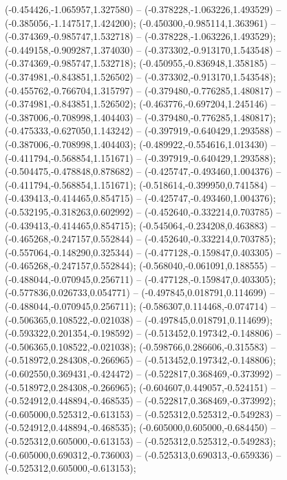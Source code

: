  (-0.454426,-1.065957,1.327580) -- (-0.378228,-1.063226,1.493529) -- (-0.385056,-1.147517,1.424200);
 (-0.450300,-0.985114,1.363961) -- (-0.374369,-0.985747,1.532718) -- (-0.378228,-1.063226,1.493529);
 (-0.449158,-0.909287,1.374030) -- (-0.373302,-0.913170,1.543548) -- (-0.374369,-0.985747,1.532718);
 (-0.450955,-0.836948,1.358185) -- (-0.374981,-0.843851,1.526502) -- (-0.373302,-0.913170,1.543548);
 (-0.455762,-0.766704,1.315797) -- (-0.379480,-0.776285,1.480817) -- (-0.374981,-0.843851,1.526502);
 (-0.463776,-0.697204,1.245146) -- (-0.387006,-0.708998,1.404403) -- (-0.379480,-0.776285,1.480817);
 (-0.475333,-0.627050,1.143242) -- (-0.397919,-0.640429,1.293588) -- (-0.387006,-0.708998,1.404403);
 (-0.489922,-0.554616,1.013430) -- (-0.411794,-0.568854,1.151671) -- (-0.397919,-0.640429,1.293588);
 (-0.504475,-0.478848,0.878682) -- (-0.425747,-0.493460,1.004376) -- (-0.411794,-0.568854,1.151671);
 (-0.518614,-0.399950,0.741584) -- (-0.439413,-0.414465,0.854715) -- (-0.425747,-0.493460,1.004376);
 (-0.532195,-0.318263,0.602992) -- (-0.452640,-0.332214,0.703785) -- (-0.439413,-0.414465,0.854715);
 (-0.545064,-0.234208,0.463883) -- (-0.465268,-0.247157,0.552844) -- (-0.452640,-0.332214,0.703785);
 (-0.557064,-0.148290,0.325344) -- (-0.477128,-0.159847,0.403305) -- (-0.465268,-0.247157,0.552844);
 (-0.568040,-0.061091,0.188555) -- (-0.488044,-0.070945,0.256711) -- (-0.477128,-0.159847,0.403305);
 (-0.577836,0.026733,0.054771) -- (-0.497845,0.018791,0.114699) -- (-0.488044,-0.070945,0.256711);
 (-0.586307,0.114468,-0.074714) -- (-0.506365,0.108522,-0.021038) -- (-0.497845,0.018791,0.114699);
 (-0.593322,0.201354,-0.198592) -- (-0.513452,0.197342,-0.148806) -- (-0.506365,0.108522,-0.021038);
 (-0.598766,0.286606,-0.315583) -- (-0.518972,0.284308,-0.266965) -- (-0.513452,0.197342,-0.148806);
 (-0.602550,0.369431,-0.424472) -- (-0.522817,0.368469,-0.373992) -- (-0.518972,0.284308,-0.266965);
 (-0.604607,0.449057,-0.524151) -- (-0.524912,0.448894,-0.468535) -- (-0.522817,0.368469,-0.373992);
 (-0.605000,0.525312,-0.613153) -- (-0.525312,0.525312,-0.549283) -- (-0.524912,0.448894,-0.468535);
 (-0.605000,0.605000,-0.684450) -- (-0.525312,0.605000,-0.613153) -- (-0.525312,0.525312,-0.549283);
 (-0.605000,0.690312,-0.736003) -- (-0.525313,0.690313,-0.659336) -- (-0.525312,0.605000,-0.613153);
